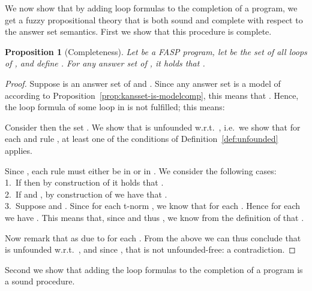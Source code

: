 \documentclass{tlp}
\newtheorem{proposition}{Proposition}
\begin{document}
 We now show that by adding loop formulas to the completion of a program, we get a fuzzy propositional theory that is both sound and complete with respect to the answer set semantics. First we show that this procedure is complete.
 


\begin{proposition}[Completeness]\label{prop:loopforms-complete}
 Let  be a FASP program, let  be the set of all loops of , and define .  For any answer set  of , it holds that . 
\end{proposition}
\begin{proof}
 Suppose  is an answer set of  and . Since any answer set is a model of  according to Proposition~\ref{prop:kansset-is-modelcomp}, this means that . Hence, the loop formula of some loop  in  is not fulfilled; this means:
  
 Consider then the set .
 We show that  is unfounded w.r.t.~, i.e.~we show that for each  and rule , at least one of the conditions of Definition~\ref{def:unfounded} applies.
 
 Since , each rule  must either be in  or in . We consider the following cases:\\
\phantom{xx}1.~If  then by construction of  it holds that .\\
  \phantom{xx}2.~If  and , by construction of  we have that .\\
   \phantom{xx}3.~Suppose  and . Since  for each t-norm , we know that  for each . Hence for each  we have . This means that, since  and thus , we know from the definition of  that .


Now remark that  as  due to  for each .
From the above we can thus conclude that  is unfounded w.r.t.~, and since , that  is not unfounded-free: a contradiction.
\end{proof}

Second we show that adding the loop formulas to the completion of a program is a sound procedure.
\end{document}
